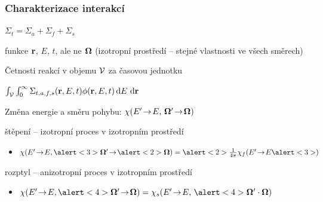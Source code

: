 \begin{frame}
  \frametitle{Charakterizace interakcí}
    \begin{myitemize}
	  \item $\Sigma_t = \Sigma_a + \Sigma_f + \Sigma_s$
	  \begin{myitemize}
	  	\item funkce $\mathbf{r}$, $E$, $t$, ale ne $\mathbf{\Omega}$ (izotropní prostředí -- stejné vlastnosti ve všech směrech)
	  \end{myitemize}
    \item Četnosti reakcí v objemu $\mathcal{V}$ za časovou jednotku
	  \begin{myitemize}
	  	\item $\int_{\mathcal{V}}{\int_{0}^{\infty}\Sigma_{t,a,f,s}(\mathbf{r},E,t)\phi(\mathbf{r},E,t)\,\mathrm{d}E\,}\,\mathrm{d}\mathbf{r}\,$
	  \end{myitemize}
	  \item Změna energie a směru pohybu: $\chi(E'\!\rightarrow\! E,\, \mathbf{\Omega}'\!\rightarrow\!\mathbf{\Omega})$
	  \begin{myitemize}
	  	\item štěpení -- \alert<2>{izotropní proces} v \alert<3>{izotropním prostředí}
	  	\begin{itemize}\vspace*{.25em}
	  		\item $\chi(E'\ra E, \alert<3>{\bomega'}\ra\alert<2>{\bomega}) = \alert<2>{\frac{1}{4\pi}}\chi_f(E'\ra E\alert<3>)$
	  	\end{itemize}
	  	\item rozptyl -- \alert<4>{anizotropní proces v izotropním prostředí}
	  	\begin{itemize}\vspace*{.25em}
	  		\item $\chi(E'\ra E, \alert<4>{\bomega'\ra\bomega}) = \chi_s(E'\ra E,\,\alert<4>{\bomega'\cdot\bomega})$
	  	\end{itemize}	  	
	  \end{myitemize}
  \end{myitemize}

\end{frame}


